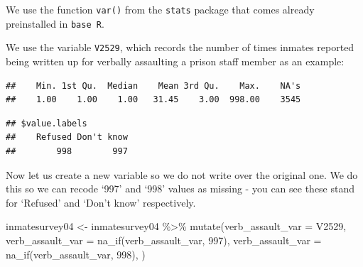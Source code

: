 \documentclass[
]{book}
\newenvironment{Shaded}{\begin{snugshade}}{\end{snugshade}}
\newcommand{\AttributeTok}[1]{\textcolor[rgb]{0.77,0.63,0.00}{#1}}
\newcommand{\CommentTok}[1]{\textcolor[rgb]{0.56,0.35,0.01}{\textit{#1}}}
\newcommand{\DecValTok}[1]{\textcolor[rgb]{0.00,0.00,0.81}{#1}}
\newcommand{\FunctionTok}[1]{\textcolor[rgb]{0.00,0.00,0.00}{#1}}
\newcommand{\NormalTok}[1]{#1}
\newcommand{\OtherTok}[1]{\textcolor[rgb]{0.56,0.35,0.01}{#1}}
\newcommand{\SpecialCharTok}[1]{\textcolor[rgb]{0.00,0.00,0.00}{#1}}
\begin{document}
We use the function \texttt{var()} from the \texttt{stats} package that comes already preinstalled in \texttt{base\ R}.

We use the variable \texttt{V2529}, which records the number of times inmates reported being written up for verbally assaulting a prison staff member as an example:

\begin{Shaded}
\end{Shaded}

\begin{verbatim}
##    Min. 1st Qu.  Median    Mean 3rd Qu.    Max.    NA's 
##    1.00    1.00    1.00   31.45    3.00  998.00    3545
\end{verbatim}

\begin{Shaded}
\end{Shaded}

\begin{verbatim}
## $value.labels
##    Refused Don't know 
##        998        997
\end{verbatim}

Now let us create a new variable so we do not write over the original one. We do this so we can recode `997' and `998' values as missing - you can see these stand for `Refused' and `Don't know' respectively.

\begin{Shaded}
\begin{Highlighting}[]
\NormalTok{inmatesurvey04 }\OtherTok{\textless{}{-}}\NormalTok{ inmatesurvey04 }\SpecialCharTok{\%\textgreater{}\%} 
  \FunctionTok{mutate}\NormalTok{(}\AttributeTok{verb\_assault\_var =}\NormalTok{ V2529,}
          \AttributeTok{verb\_assault\_var =} \FunctionTok{na\_if}\NormalTok{(verb\_assault\_var, }\DecValTok{997}\NormalTok{),}
          \AttributeTok{verb\_assault\_var =} \FunctionTok{na\_if}\NormalTok{(verb\_assault\_var, }\DecValTok{998}\NormalTok{),}
\NormalTok{         )}
\end{Highlighting}
\end{Shaded}
\end{document}
